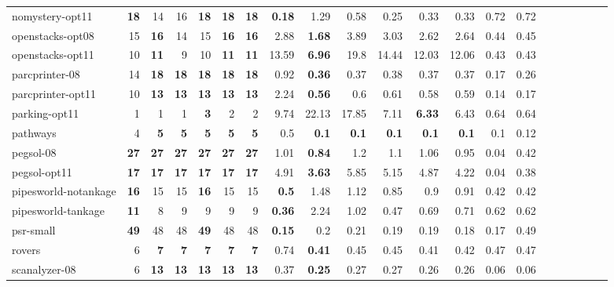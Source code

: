 \begin{table}[h!]
{\begin{tabular}{|l|r|r|r|r|r|r||r|r|r|r|r|r||r|r|r|r|r|r||r|r|}
nomystery-opt11 & \textbf{18} & 14 & 16 & \textbf{18} & \textbf{18} & \textbf{18} & \textbf{0.18} & 1.29 & 0.58 & 0.25 & 0.33 & 0.33 & 0.72 & 0.72 \\
openstacks-opt08 & 15 & \textbf{16} & 14 & 15 & \textbf{16} & \textbf{16} & 2.88 & \textbf{1.68} & 3.89 & 3.03 & 2.62 & 2.64 & 0.44 & 0.45 \\
openstacks-opt11 & 10 & \textbf{11} & 9 & 10 & \textbf{11} & \textbf{11} & 13.59 & \textbf{6.96} & 19.8 & 14.44 & 12.03 & 12.06 & 0.43 & 0.43 \\
parcprinter-08 & 14 & \textbf{18} & \textbf{18} & \textbf{18} & \textbf{18} & \textbf{18} & 0.92 & \textbf{0.36} & 0.37 & 0.38 & 0.37 & 0.37 & 0.17 & 0.26 \\
parcprinter-opt11 & 10 & \textbf{13} & \textbf{13} & \textbf{13} & \textbf{13} & \textbf{13} & 2.24 & \textbf{0.56} & 0.6 & 0.61 & 0.58 & 0.59 & 0.14 & 0.17 \\
parking-opt11 & 1 & 1 & 1 & \textbf{3} & 2 & 2 & 9.74 & 22.13 & 17.85 & 7.11 & \textbf{6.33} & 6.43 & 0.64 & 0.64 \\
pathways & 4 & \textbf{5} & \textbf{5} & \textbf{5} & \textbf{5} & \textbf{5} & 0.5 & \textbf{0.1} & \textbf{0.1} & \textbf{0.1} & \textbf{0.1} & \textbf{0.1} & 0.1 & 0.12 \\
pegsol-08 & \textbf{27} & \textbf{27} & \textbf{27} & \textbf{27} & \textbf{27} & \textbf{27} & 1.01 & \textbf{0.84} & 1.2 & 1.1 & 1.06 & 0.95 & 0.04 & 0.42 \\
pegsol-opt11 & \textbf{17} & \textbf{17} & \textbf{17} & \textbf{17} & \textbf{17} & \textbf{17} & 4.91 & \textbf{3.63} & 5.85 & 5.15 & 4.87 & 4.22 & 0.04 & 0.38 \\
pipesworld-notankage & \textbf{16} & 15 & 15 & \textbf{16} & 15 & 15 & \textbf{0.5} & 1.48 & 1.12 & 0.85 & 0.9 & 0.91 & 0.42 & 0.42 \\
pipesworld-tankage & \textbf{11} & 8 & 9 & 9 & 9 & 9 & \textbf{0.36} & 2.24 & 1.02 & 0.47 & 0.69 & 0.71 & 0.62 & 0.62 \\
psr-small & \textbf{49} & 48 & 48 & \textbf{49} & 48 & 48 & \textbf{0.15} & 0.2 & 0.21 & 0.19 & 0.19 & 0.18 & 0.17 & 0.49 \\
rovers & 6 & \textbf{7} & \textbf{7} & \textbf{7} & \textbf{7} & \textbf{7} & 0.74 & \textbf{0.41} & 0.45 & 0.45 & 0.41 & 0.42 & 0.47 & 0.47 \\
scanalyzer-08 & 6 & \textbf{13} & \textbf{13} & \textbf{13} & \textbf{13} & \textbf{13} & 0.37 & \textbf{0.25} & 0.27 & 0.27 & 0.26 & 0.26 & 0.06 & 0.06 \\

\end{tabular}}
\end{table}
